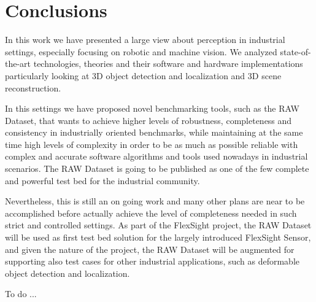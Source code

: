 \chapter{Conclusions}\label{ch:conclusions}
In this work we have presented a large view about perception in industrial settings, especially focusing on robotic and machine vision. We analyzed state-of-the-art technologies, theories and their software and hardware implementations particularly looking at 3D object detection and localization and 3D scene reconstruction.

In this settings we have proposed novel benchmarking tools, such as the RAW Dataset, that wants to achieve higher levels of robustness, completeness and consistency in industrially oriented benchmarks, while maintaining at the same time high levels of complexity in order to be as much as possible reliable with complex and accurate software algorithms and tools used nowadays in industrial scenarios. The RAW Dataset is going to be published as one of the few complete and powerful test bed for the industrial community.

Nevertheless, this is still an on going work and many other plans are near to be accomplished before actually achieve the level of completeness needed in such strict and controlled settings. As part of the FlexSight project, the RAW Dataset will be used as first test bed solution for the largely introduced FlexSight Sensor, and given the nature of the project, the RAW Dataset will be augmented for supporting also test cases for other industrial applications, such as deformable object detection and localization.

\newpage

\begin{acknowledgements}
To do ...
\end{acknowledgements}